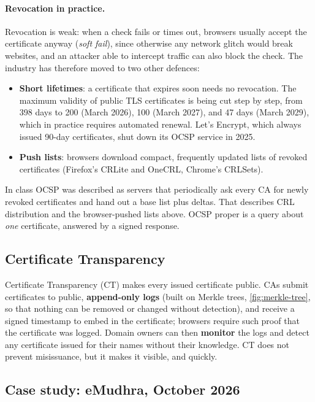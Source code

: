 \paragraph{Revocation in practice.} Revocation is weak: when a check fails or times out, browsers usually accept the certificate anyway (\emph{soft fail}), since otherwise any network glitch would break websites, and an attacker able to intercept traffic can also block the check. The industry has therefore moved to two other defences:
\begin{itemize}
    \item \textbf{Short lifetimes}: a certificate that expires soon needs no revocation. The maximum validity of public TLS certificates is being cut step by step, from 398 days to 200 (March 2026), 100 (March 2027), and 47 days (March 2029), which in practice requires automated renewal. Let's Encrypt, which always issued 90-day certificates, shut down its OCSP service in 2025.
    \item \textbf{Push lists}: browsers download compact, frequently updated lists of revoked certificates (Firefox's CRLite and OneCRL, Chrome's CRLSets).
\end{itemize}

\begin{remark}
In class OCSP was described as servers that periodically ask every CA for newly revoked certificates and hand out a base list plus deltas. That describes CRL distribution and the browser-pushed lists above. OCSP proper is a query about \emph{one} certificate, answered by a signed response.
\end{remark}

\subsection{Certificate Transparency}

Certificate Transparency (CT) makes every issued certificate public. CAs submit certificates to public, \textbf{append-only logs} (built on Merkle trees, \cref{fig:merkle-tree}, so that nothing can be removed or changed without detection), and receive a signed timestamp to embed in the certificate; browsers require such proof that the certificate was logged. Domain owners can then \textbf{monitor} the logs and detect any certificate issued for their names without their knowledge. CT does not prevent misissuance, but it makes it visible, and quickly.

\subsection{Case study: eMudhra, October 2026}

